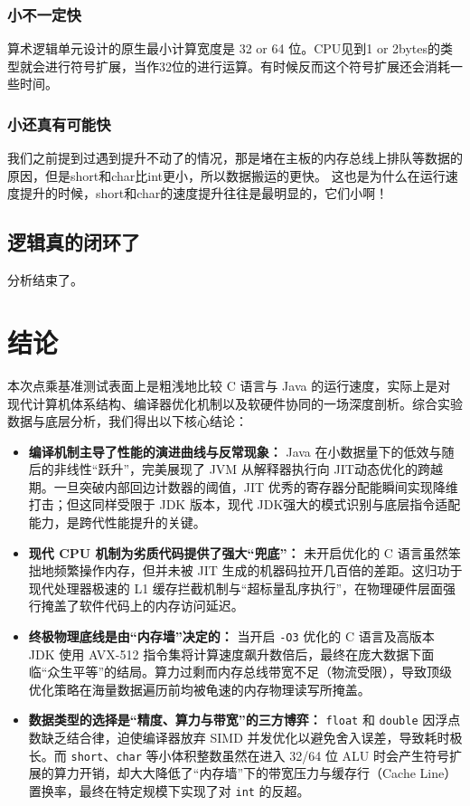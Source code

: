 \documentclass[UTF8]{ctexart}
\begin{document}
\subsubsection{小不一定快}
算术逻辑单元设计的原生最小计算宽度是 32 or 64 位。CPU见到1 or 2bytes的类型就会进行符号扩展，当作32位的进行运算。有时候反而这个符号扩展还会消耗一些时间。
\subsubsection{小还真有可能快}
我们之前提到过遇到提升不动了的情况，那是堵在主板的内存总线上排队等数据的原因，但是short和char比int更小，所以数据搬运的更快。
这也是为什么在运行速度提升的时候，short和char的速度提升往往是最明显的，它们小啊！
\subsection{逻辑真的闭环了}
分析结束了。
\section{结论}
本次点乘基准测试表面上是粗浅地比较 C 语言与 Java 的运行速度，实际上是对现代计算机体系结构、编译器优化机制以及软硬件协同的一场深度剖析。综合实验数据与底层分析，我们得出以下核心结论：

\begin{itemize}
    \item \textbf{编译机制主导了性能的演进曲线与反常现象：} 
    Java 在小数据量下的低效与随后的非线性“跃升”，完美展现了 JVM 从解释器执行向 JIT动态优化的跨越期。一旦突破内部回边计数器的阈值，JIT 优秀的寄存器分配能瞬间实现降维打击；但这同样受限于 JDK 版本，现代 JDK强大的模式识别与底层指令适配能力，是跨代性能提升的关键。
    \item \textbf{现代 CPU 机制为劣质代码提供了强大“兜底”：} 
    未开启优化的 C 语言虽然笨拙地频繁操作内存，但并未被 JIT 生成的机器码拉开几百倍的差距。这归功于现代处理器极速的 L1 缓存拦截机制与“超标量乱序执行”，在物理硬件层面强行掩盖了软件代码上的内存访问延迟。
    \item \textbf{终极物理底线是由“内存墙”决定的：} 
    当开启 \texttt{-O3} 优化的 C 语言及高版本 JDK 使用 AVX-512 指令集将计算速度飙升数倍后，最终在庞大数据下面临“众生平等”的结局。算力过剩而内存总线带宽不足（物流受限），导致顶级优化策略在海量数据遍历前均被龟速的内存物理读写所掩盖。
    \item \textbf{数据类型的选择是“精度、算力与带宽”的三方博弈：} 
    \texttt{float} 和 \texttt{double} 因浮点数缺乏结合律，迫使编译器放弃 SIMD 并发优化以避免舍入误差，导致耗时极长。而 \texttt{short}、\texttt{char} 等小体积整数虽然在进入 32/64 位 ALU 时会产生符号扩展的算力开销，却大大降低了“内存墙”下的带宽压力与缓存行（Cache Line）置换率，最终在特定规模下实现了对 \texttt{int} 的反超。
\end{itemize}
\end{document}
